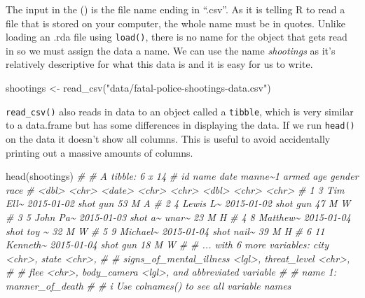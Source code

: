 \documentclass[
  a4paper,
]{krantz}
\makeatletter
\newenvironment{Shaded}{\begin{snugshade}}{\end{snugshade}}
\newcommand{\CommentTok}[1]{\textcolor[rgb]{0.37,0.37,0.37}{\textit{#1}}}
\newcommand{\FunctionTok}[1]{\textcolor[rgb]{0,0,0}{#1}}
\newcommand{\NormalTok}[1]{#1}
\newcommand{\OtherTok}[1]{\textcolor[rgb]{0.37,0.37,0.37}{#1}}
\newcommand{\StringTok}[1]{\textcolor[rgb]{0.5,0.5,0.5}{#1}}
\newenvironment{kframe}{%
\medskip{}
\setlength{\fboxsep}{.8em}
 \def\at@end@of@kframe{}%
 \ifinner\ifhmode%
  \def\at@end@of@kframe{\end{minipage}}%
  \begin{minipage}{\columnwidth}%
 \fi\fi%
 \def\FrameCommand##1{\hskip\@totalleftmargin \hskip-\fboxsep
 \colorbox{shadecolor}{##1}\hskip-\fboxsep
     \hskip-\linewidth \hskip-\@totalleftmargin \hskip\columnwidth}%
 \MakeFramed {\advance\hsize-\width
   \@totalleftmargin\z@ \linewidth\hsize
   \@setminipage}}%
 {\par\unskip\endMakeFramed%
 \at@end@of@kframe}
\renewenvironment{Shaded}{\begin{kframe}}{\end{kframe}}
\makeatother
\begin{document}
The input in the () is the file name ending in ``.csv''. As
it is telling R to read a file that is stored on your
computer, the whole name must be in quotes. Unlike loading
an .rda file using \texttt{load()}, there is no name for the
object that gets read in so we must assign the data a name.
We can use the name \emph{shootings} as it's relatively
descriptive for what this data is and it is easy for us to
write.

\begin{Shaded}
\begin{Highlighting}[]
\NormalTok{shootings }\OtherTok{\textless{}{-}} \FunctionTok{read\_csv}\NormalTok{(}\StringTok{"data/fatal{-}police{-}shootings{-}data.csv"}\NormalTok{)}
\end{Highlighting}
\end{Shaded}

\texttt{read\_csv()} also reads in data to an object called
a \texttt{tibble}, which is very similar to a data.frame but
has some differences in displaying the data. If we run
\texttt{head()} on the data it doesn't show all columns.
This is useful to avoid accidentally printing out a massive
amounts of columns.

\begin{Shaded}
\begin{Highlighting}[]
\FunctionTok{head}\NormalTok{(shootings)}
\CommentTok{\# \# A tibble: 6 x 14}
\CommentTok{\#      id name     date       manne\textasciitilde{}1 armed   age gender race }
\CommentTok{\#   \textless{}dbl\textgreater{} \textless{}chr\textgreater{}    \textless{}date\textgreater{}     \textless{}chr\textgreater{}   \textless{}chr\textgreater{} \textless{}dbl\textgreater{} \textless{}chr\textgreater{}  \textless{}chr\textgreater{}}
\CommentTok{\# 1     3 Tim Ell\textasciitilde{} 2015{-}01{-}02 shot    gun      53 M      A    }
\CommentTok{\# 2     4 Lewis L\textasciitilde{} 2015{-}01{-}02 shot    gun      47 M      W    }
\CommentTok{\# 3     5 John Pa\textasciitilde{} 2015{-}01{-}03 shot a\textasciitilde{} unar\textasciitilde{}    23 M      H    }
\CommentTok{\# 4     8 Matthew\textasciitilde{} 2015{-}01{-}04 shot    toy \textasciitilde{}    32 M      W    }
\CommentTok{\# 5     9 Michael\textasciitilde{} 2015{-}01{-}04 shot    nail\textasciitilde{}    39 M      H    }
\CommentTok{\# 6    11 Kenneth\textasciitilde{} 2015{-}01{-}04 shot    gun      18 M      W    }
\CommentTok{\# \# ... with 6 more variables: city \textless{}chr\textgreater{}, state \textless{}chr\textgreater{},}
\CommentTok{\# \#   signs\_of\_mental\_illness \textless{}lgl\textgreater{}, threat\_level \textless{}chr\textgreater{},}
\CommentTok{\# \#   flee \textless{}chr\textgreater{}, body\_camera \textless{}lgl\textgreater{}, and abbreviated variable}
\CommentTok{\# \#   name 1: manner\_of\_death}
\CommentTok{\# \# i Use \textasciigrave{}colnames()\textasciigrave{} to see all variable names}
\end{Highlighting}
\end{Shaded}
\end{document}
